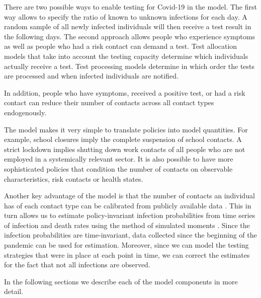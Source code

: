 There are two possible ways to enable testing for Covid-19 in the model. The first way allows to specify the ratio of known to unknown infections for each day. A random sample of all newly infected individuals will then receive a test result in the following days. The second approach allows people who experience symptoms as well as people who had a risk contact can demand a test. Test allocation models that take into account the testing capacity determine which individuals actually receive a test. Test processing models determine in which order the tests are processed and when infected individuals are notified.

In addition, people who have symptoms, received a positive test, or had a risk contact can reduce their number of contacts across all contact types endogenously.

The model makes it very simple to translate policies into model quantities. For example, school closures imply the complete suspension of school contacts. A strict lockdown implies shutting down work contacts of all people who are not employed in a systemically relevant sector. It is also possible to have more sophisticated policies that condition the number of contacts on observable characteristics, risk contacts or health states.

Another key advantage of the model is that the number of contacts an individual has of each contact type can be calibrated from publicly available data \citep{Mossong2008}. This in turn allows us to estimate policy-invariant infection probabilities from time series of infection and death rates using the method of simulated moments \citep{McFadden1989}. Since the infection probabilities are time-invariant, data collected since the beginning of the pandemic can be used for estimation. Moreover, since we can model the testing strategies that were in place at each point in time, we can correct the estimates for the fact that not all infections are observed.

In the following sections we describe each of the model components in more detail.
